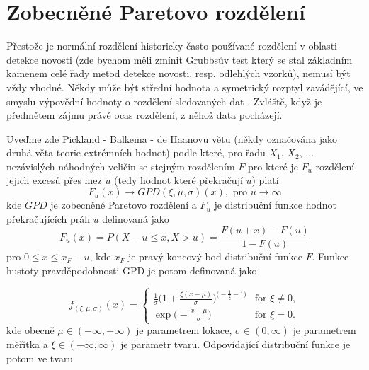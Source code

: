 \chapter{Zobecněné Paretovo rozdělení}\label{chap:gpd}
Přestože je normální rozdělení historicky často používané rozdělení v oblasti detekce novosti (zde bychom měli zmínit Grubbsův test \cite{grubbs} který se stal základním kamenem celé řady metod detekce novosti, resp. odlehlých vzorků), nemusí být vždy vhodné. Někdy může být střední hodnota a symetrický rozptyl zavádějící, ve smyslu výpovědní hodnoty o rozdělení sledovaných dat \cite{gpd4}. Zvláště, když je předmětem zájmu právě ocas rozdělení, z něhož data pocházejí. 
\par 
Uveďme zde Pickland - Balkema - de Haanovu větu \cite{gpd5,gpd6} (někdy označována jako druhá věta teorie extrémních hodnot) podle které, pro řadu $X_1$, $X_2$, $\dots$ nezávislých náhodných veličin se stejným rozdělením $F$ pro které je $F_u$ rozdělení jejich excesů přes mez $u$ (tedy hodnot které překračují $u$) platí
\begin{equation}
    F_u (x) \rightarrow GPD(\xi, \mu ,\sigma) (x), \text{ pro } u \rightarrow \infty
\end{equation}
kde $GPD$ je zobecněné Paretovo rozdělení a $F_u$ je distribuční funkce hodnot překračujících práh $u$ definovaná jako
\begin{equation}
    F_u(x)=P(X-u \leq x,X>u)=\frac{F(u+x)-F(u)}{1-F(u)}
\end{equation}
pro $0 \leq x \leq x_F-u$, kde $x_F$ je pravý koncový bod distribuční funkce $F$. Funkce hustoty pravděpodobnosti GPD je potom definovaná jako

\begin{equation}
  f_{(\xi,\mu,\sigma)}(x)=\begin{cases}
    \frac{1}{\sigma}\Bigg(1+\frac{\xi(x-\mu)}{\sigma}\Bigg)^{\Big(-\frac{1}{\xi}-1\Big)} & \text{for $\xi \neq 0$},\\
    \exp \Big(-\frac{x-\mu}{\sigma}\Big) & \text{for $\xi = 0$}.
  \end{cases}
\end{equation}
kde obecně $\mu \in (-\infty,+\infty )$ je parametrem lokace, $\sigma \in (0, \infty)$ je parametrem měřítka a $\xi \in (-\infty, \infty)$ je parametr tvaru. Odpovídající distribuční funkce je potom ve tvaru

